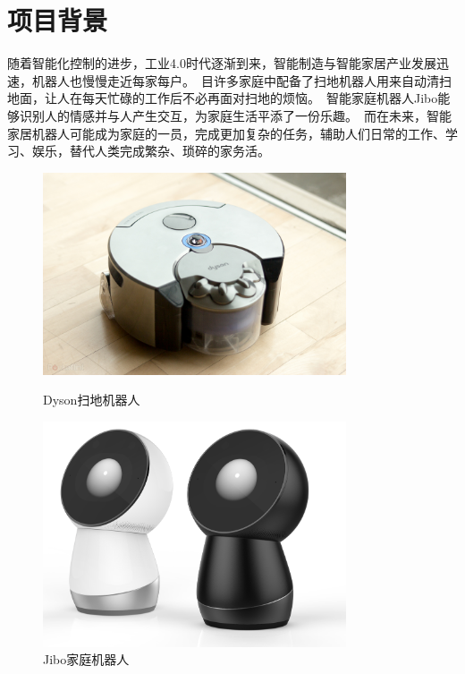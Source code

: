 \section{项目背景}

随着智能化控制的进步，工业4.0时代逐渐到来，智能制造与智能家居产业发展迅速，机器人也慢慢走近每家每户。\ 目许多家庭中配备了扫地机器人用来自动清扫地面，让人在每天忙碌的工作后不必再面对扫地的烦恼。\ 智能家庭机器人Jibo能够识别人的情感并与人产生交互，为家庭生活平添了一份乐趣。\ 而在未来，智能家居机器人可能成为家庭的一员，完成更加复杂的任务，辅助人们日常的工作、学习、娱乐，替代人类完成繁杂、琐碎的家务活。\

\begin{figure}[H]
\begin{minipage}[t]{0.5\textwidth}
	\centering
    \includegraphics[width = 0.8\textwidth]{pictures/dyson.jpg}
    \caption{Dyson扫地机器人}
    \label{fig:dyson}
\end{minipage}
\begin{minipage}[t]{0.5\textwidth}
	\centering
    \includegraphics[width = 0.8\textwidth]{pictures/jibo.png}
    \caption{Jibo家庭机器人}
    \label{fig:jibo}
\end{minipage}
\end{figure}


